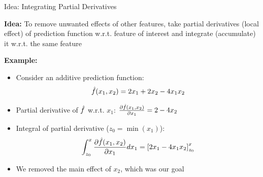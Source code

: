 \documentclass[11pt,compress,t,notes=noshow, aspectratio=169, xcolor=table]{beamer}
\begin{document}
\begin{frame}{Idea: Integrating Partial Derivatives}

\textbf{Idea:} To remove unwanted effects of other features, take partial derivatives (local effect) of prediction function w.r.t. feature of interest and integrate (accumulate) it w.r.t. the same feature

\pause\lz

\textbf{Example:}
\begin{itemize}[<+->]
\item Consider an additive prediction function: $$\fh(x_1, x_2) = 2x_1 + 2x_2 - 4x_1 x_2$$
\item Partial derivative of $\fh$ w.r.t. $x_1$:
$\frac{\partial \fh(x_1, x_2)}{\partial x_1} = 2 - 4x_2$
\item Integral of partial derivative ($z_0 = \min(x_1)$):
$$\int_{z_0}^{x} \frac{\partial \fh(x_1, x_2)}{\partial x_1} dx_1 = \left[2x_1 - 4x_1 x_2\right]_{z_0}^{x}$$
\item We removed the main effect of $x_2$, which was our goal
\end{itemize}
\end{frame}
\end{document}
